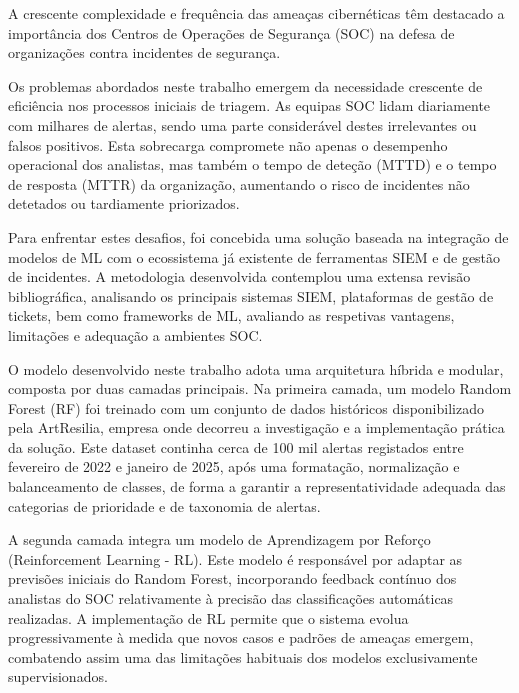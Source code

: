 \begin{abstractotherlanguage}

A crescente complexidade e frequência das ameaças cibernéticas têm destacado a importância dos Centros de Operações de Segurança (SOC) na defesa de organizações contra incidentes de segurança. 

Os problemas abordados neste trabalho emergem da necessidade crescente de eficiência nos processos iniciais de triagem. 
As equipas SOC lidam diariamente com milhares de alertas, sendo uma parte considerável destes irrelevantes ou falsos positivos. 
Esta sobrecarga compromete não apenas o desempenho operacional dos analistas, mas também o tempo de deteção (MTTD) e o tempo de resposta (MTTR) da organização, aumentando o risco de incidentes não detetados ou tardiamente priorizados.

Para enfrentar estes desafios, foi concebida uma solução baseada na integração de modelos de ML com o ecossistema já existente de ferramentas SIEM e de gestão de incidentes. 
A metodologia desenvolvida contemplou uma extensa revisão bibliográfica, analisando os principais sistemas SIEM, plataformas de gestão de tickets, bem como frameworks de ML, avaliando as respetivas vantagens, limitações e adequação a ambientes SOC.

O modelo desenvolvido neste trabalho adota uma arquitetura híbrida e modular, composta por duas camadas principais. 
Na primeira camada, um modelo Random Forest (RF) foi treinado com um conjunto de dados históricos disponibilizado pela ArtResilia, empresa onde decorreu a investigação e a implementação prática da solução. 
Este dataset continha cerca de 100 mil alertas registados entre fevereiro de 2022 e janeiro de 2025, após uma formatação, normalização e balanceamento de classes, de forma a garantir a representatividade adequada das categorias de prioridade e de taxonomia de alertas.

A segunda camada integra um modelo de Aprendizagem por Reforço (Reinforcement Learning - RL). 
Este modelo é responsável por adaptar as previsões iniciais do Random Forest, incorporando feedback contínuo dos analistas do SOC relativamente à precisão das classificações automáticas realizadas. 
A implementação de RL permite que o sistema evolua progressivamente à medida que novos casos e padrões de ameaças emergem, combatendo assim uma das limitações habituais dos modelos exclusivamente supervisionados.


\end{abstractotherlanguage}
